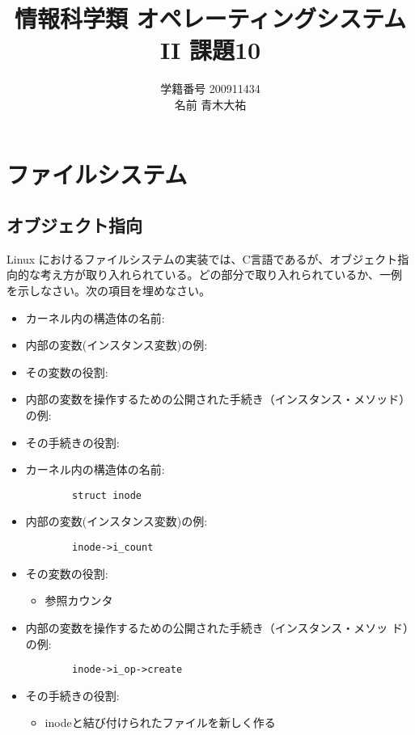 \documentclass[a4j,9pt]{jsarticle}
\title{情報科学類 オペレーティングシステムII 課題10}
\author{学籍番号 200911434 \\ 名前 青木大祐}
\begin{document}
\maketitle
\setcounter{section}{9}
\section{ファイルシステム}
\setcounter{subsection}{1000}
\subsection{オブジェクト指向}
\begin{screen}
Linux におけるファイルシステムの実装では、C言語であるが、オブジェクト指
 向的な考え方が取り入れられている。どの部分で取り入れられているか、一例
 を示しなさい。次の項目を埋めなさい。
\begin{itemize}
 \item カーネル内の構造体の名前:
 \item 内部の変数(インスタンス変数)の例:
 \item その変数の役割:
 \item 内部の変数を操作するための公開された手続き（インスタンス・メソッド）の例:
 \item その手続きの役割:
\end{itemize}
\end{screen}
\begin{itemize}
 \item カーネル内の構造体の名前:
       \begin{lstlisting}
        struct inode
       \end{lstlisting}
 
 \item 内部の変数(インスタンス変数)の例:
       \begin{lstlisting}
        inode->i_count
       \end{lstlisting}
 \item その変数の役割:
       \begin{itemize}
        \item 参照カウンタ
       \end{itemize}
 \item 内部の変数を操作するための公開された手続き（インスタンス・メソッ
       ド）の例:
       \begin{lstlisting}
        inode->i_op->create
       \end{lstlisting}
 \item その手続きの役割:
       \begin{itemize}
        \item inodeと結び付けられたファイルを新しく作る
       \end{itemize}
\end{itemize}
\end{document}
